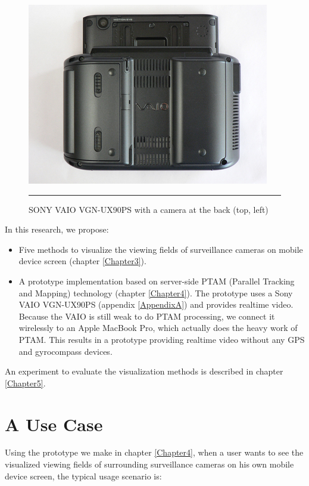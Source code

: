 \begin{figure}[htbp]
	\centering
	\includegraphics{./Primitives/vaio_back.jpg}
	\rule{35em}{0.5pt}
	\caption[SONY VAIO VGN-UX90PS with a camera at the back]{SONY VAIO VGN-UX90PS with a camera at the back (top, left)}
	\label{fig:VAIOBack}
\end{figure}

In this research, we propose:

\begin{itemize}
	\item Five methods to visualize the viewing fields of surveillance cameras on mobile device screen (chapter \ref{Chapter3}).
	\item A prototype implementation based on server-side PTAM (Parallel Tracking and Mapping) \citep{Reference12} technology (chapter \ref{Chapter4}). The prototype uses a Sony VAIO VGN-UX90PS (appendix \ref{AppendixA}) and provides realtime video. Because the VAIO is still weak to do PTAM processing, we connect it wirelessly to an Apple MacBook Pro, which actually does the heavy work of PTAM. This results in a prototype providing realtime video without any GPS and gyrocompass devices.
\end{itemize}

An experiment to evaluate the visualization methods is described in chapter \ref{Chapter5}.

\section{A Use Case}
\label{AUseCase}

Using the prototype we make in chapter \ref{Chapter4}, when a user wants to see the visualized viewing fields of surrounding surveillance cameras on his own mobile device screen, the typical usage scenario is:

